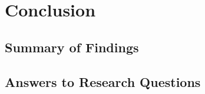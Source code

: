 \chapter{Conclusion}
\label{ch:conclusion}

%
%


\section{Summary of Findings}
\label{sec:concl_summary}

%
%
%
%
%
%
%


\section{Answers to Research Questions}
\label{sec:concl_rqs}

%
%
%
%
%
%
%
%
%


